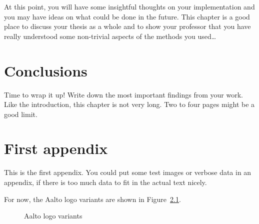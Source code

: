 \documentclass[12pt,a4paper,oneside,pdftex]{report}
\begin{document}
At this point, you will have some insightful thoughts on your implementation
and you may have ideas on what could be done in the future.
This chapter is a good place to discuss your thesis as a whole and to show your
professor that you have really understood some non-trivial aspects of the
methods you used\ldots



% 

\chapter{Conclusions}
\label{chapter:conclusions}

Time to wrap it up!
Write down the most important findings from your work.
Like the introduction, this chapter is not very long.
Two to four pages might be a good limit.



% 



\appendix
% 

\chapter{First appendix}
\label{chapter:first-appendix}

This is the first appendix. You could put some test images or verbose data in an
appendix, if there is too much data to fit in the actual text nicely.

For now, the Aalto logo variants are shown in Figure~\ref{fig:aaltologo}.

\begin{figure}
\begin{center}
\caption{Aalto logo variants}
\label{fig:aaltologo}
\end{center}
\end{figure}


\end{document}
